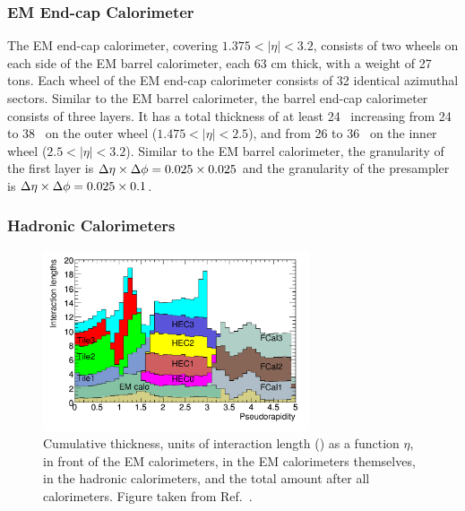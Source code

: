 {\subsubsection{EM End-cap Calorimeter}
The EM end-cap calorimeter, covering $1.375<|\eta|<3.2$, consists of two wheels on each side of the EM barrel calorimeter, each 63 cm thick, with a weight of 27 tons. Each wheel of the EM end-cap calorimeter consists of 32 identical azimuthal sectors. Similar to the EM barrel calorimeter, the barrel end-cap calorimeter consists of three layers. It has a total thickness of at least 24 \radlen\, increasing from 24 to 38 \radlen\ on the outer wheel ($1.475<|\eta|<2.5$), and from 26 to 36 \radlen\ on the inner wheel ($2.5<|\eta|<3.2$). Similar to the EM barrel calorimeter, the granularity of the first layer is $\mbox{$\Delta \eta$}\times\mbox{$\Delta \phi$}=0.025\times0.025$ and the granularity of the presampler is $\mbox{$\Delta \eta$}\times\mbox{$\Delta \phi$}=0.025\times0.1$.

\subsubsection{Hadronic Calorimeters}

\begin{figure}
	\centering
	\includegraphics[width=0.7\textwidth]{figures/interaction_lengths.pdf} %
	\caption{Cumulative thickness, units of interaction length (\intlen) as a function $\eta$, in front of the EM calorimeters, in the EM calorimeters themselves, in the hadronic calorimeters, and the total amount after all calorimeters. Figure taken from Ref.~\cite{Aad:2008zzm}.}	
	\label{fig:interactionlengths}
\end{figure}

}
